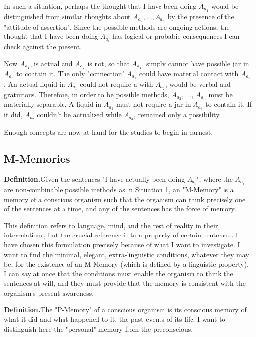 \documentclass[10pt,twoside,draft]{memoir}
\begin{document}
{In such a situation, perhaps the thought that I have been doing $A_{a_1}$
would be distinguished from similar thoughts about $A_{a_2}, ..., A_{a_n}$ by the
presence of the "attitude of assertion". Since the possible methods are 
ongoing actions, the thought that I have been doing $A_{a_i}$ has logical or 
probabie consequences I can check against the present. 

Now $A_{a_1}$, is actual and $A_{a_2}$ is not, so that $A_{a_1}$, simply cannot have 
possible jar in $A_{a_3}$ to contain it. The only "connection" $A_{a_1}$ could have
material contact with $A_{a_2}$. An actual liquid in $A_{a_1}$ could not require a 
with $A_{a_2}$, would be verbal and gratuitous. Therefore, in order to be possible 
methods, $A_{a_2}$, ..., $A_{a_n}$ must be materially separable. A liquid in $A_{a_2}$ must
not require a jar in $A_{a_3}$ to contain it. If it did, $A_{a_2}$ couldn't be actualized 
while $A_{a_3}$, remained only a possibility. 

Enough concepts are now at hand for the studies to begin in earnest. 

\subsection{M-Memories}

\newcommand{\definition}{\textbf{Definition.}}
\newcommand{\assumption}[1]{\textit{Assumption #1.}}
\newcommand{\conclusion}[1]{\textbf{Conclusion #1.}}

\definition Given the sentences "I have actually been doing $A_{a_i}$", where 
the $A_{a_i}$ are non-combinable possible methods as in Situation 1, an 
"M-Memory" is a memory of a conscious organism such that the organism 
can think precisely one of the sentences at a time, and any of the sentences 
has the force of memory. 

This definition refers to language, mind, and the rest of reality in their 
interrelations, but the crucial reference is to a property of certain sentences. 
I have chosen this formulation precisely because of what I want to 
investigate. I want to find the minimal, elegant, extra-linguistic conditions, 
whatever they may be, for the existence of an M-Memory (which is defined 
by a linguistic property). I can say at once that the conditions must enable 
the organism to think the sentences at will, and they must provide that the 
memory is consistent with the organism's present awareness. 

\definition The "P-Memory" of a conscious organism is its conscious 
memory of what it did and what happened to it, the past events of its life. I 
want to distinguish here the "personal" memory from the preconscious. 

}
\end{document}
